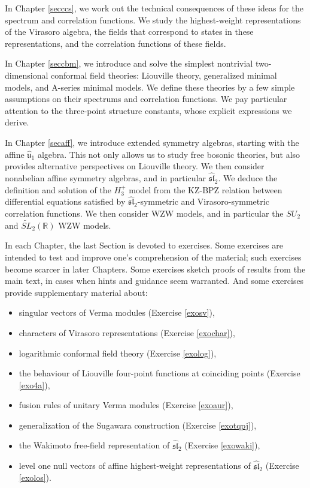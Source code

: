 \documentclass[12pt, a4paper, notitlepage, twoside]{report}
\numberwithin{equation}{section}
\theoremstyle{break}
\begin{document}
In Chapter \ref{secccs}, we work out the technical consequences of these ideas for the spectrum and correlation functions.
We study the highest-weight representations of the Virasoro algebra, the fields that correspond to states in these representations, and the correlation functions of these fields. 

In Chapter \ref{seccbm}, we introduce and solve the simplest nontrivial two-dimensional conformal field theories: Liouville theory, generalized minimal models, and A-series minimal models.
We define these theories by a few simple assumptions on their spectrums and correlation functions.
We pay particular attention to the three-point structure constants, whose explicit expressions we derive. 

In Chapter \ref{secaff}, we introduce extended symmetry algebras, starting with the affine $\hat{\mathfrak{u}}_1$ algebra.
This not only allows us to study free bosonic theories, but also provides alternative perspectives on Liouville theory.
We then consider nonabelian affine symmetry algebras, and in particular $\widehat{\mathfrak{sl}}_2$.
We deduce the definition and solution of the $H_3^+$ model from the KZ-BPZ relation between differential equations satisfied by $\widehat{\mathfrak{sl}}_2$-symmetric and Virasoro-symmetric correlation functions.
We then consider WZW models, and in particular the $SU_2$ and $\widetilde{SL}_2(\mathbb{R})$ WZW models. 

In each Chapter, the last Section is devoted to exercises.
Some exercises are intended to test and improve one's comprehension of the material; such exercises become scarcer in later Chapters.
Some exercises sketch proofs of results from the main text, in cases when hints and guidance seem warranted.
And some exercises provide supplementary material about: 
\begin{itemize}
 \item singular vectors of Verma modules (Exercise \ref{exosv}),
 \item characters of Virasoro representations (Exercise \ref{exochar}),
\item logarithmic conformal field theory (Exercise \ref{exolog}), 
\item the behaviour of Liouville four-point functions at coinciding points (Exercise \ref{exo4a}),
\item fusion rules of unitary Verma modules (Exercise \ref{exoaur}), 
\item generalization of the Sugawara construction (Exercise \ref{exotqpj}),
\item the Wakimoto free-field representation of $\widehat{\mathfrak{sl}}_2$ (Exercise \ref{exowaki}),
\item level one null vectors of affine highest-weight representations of $\widehat{\mathfrak{sl}}_2$ (Exercise \ref{exolos}).
\end{itemize}
\end{document}
